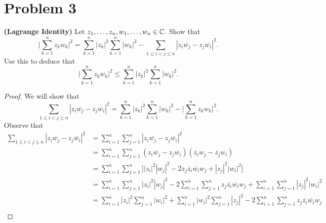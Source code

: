 \documentclass[a4paper]{article}
\begin{document}
    \section*{Problem 3} \textbf{(Lagrange Identity)} Let \( {z}_{1}, \dots, {z}_{n}, {w}_{1}, \dots, {w}_{n} \in \mathbb{C}   \). Show that    
        \[  \Big| \sum_{ k=1  }^{ n } {z}_{k} {w}_{k} \Big|^{2} = \sum_{ k=1  }^{ n } | {z}_{k} |^{2} \sum_{ k=1  }^{ n } | {w}_{k } |^{2} - \sum_{ 1 \leq i < j \leq n  }^{  } | {z}_{i} \overline{{w}_{j}} - {z}_{j} \overline{{w}_{i}} |^{2}. \]
        Use this to deduce that 
        \[  \Big| \sum_{ k=1  }^{ n } {z}_{k } {w}_{k } \Big|^{2} \leq \sum_{ k=1  }^{ n } | {z}_{k} |^{2} \sum_{ k=1  }^{ n } | {w}_{k } |^{2}. \]
        \begin{proof}
        We will show that 
        \[  \sum_{ 1 \leq i < j \leq n  }^{  } | {z}_{i} \overline{{w}_{j}} - {z}_{j} \overline{{w}_{i}} |^{2} = \sum_{ k=1  }^{ n } | {z}_{k } |^{2} \sum_{ k=1  }^{ n } | {w}_{k } |^{2} - \Big|  \sum_{ k=1  }^{ n } {z}_{k } {w}_{k } \Big|^{2}. \]
        Observe that 
        \begin{align*}
            \sum_{ 1 \leq i < j \leq n  }^{  } | {z}_{i} \overline{{w}_{j}} - {z}_{j} \overline{{w}_{i}}  |^{2} &= \sum_{ i=1  }^{ n } \sum_{ j=1  }^{ n } | {z}_{i} \overline{{w}_{j}} - {z}_{j} \overline{{w}_{i}} |^{2}  \\
                                                                                                                &= \sum_{ i=1  }^{ n } \sum_{ j=1  }^{ n } ({z}_{i} \overline{{w}_{j}} - {z}_{j} \overline{{w}_{i}})(\overline{{z}_{i}} {w}_{j} - \overline{{z}_{j}} {w}_{i}) \\
                                                                                                                &= \sum_{ i=1  }^{ n } \sum_{ j=1  }^{ n } \Big[ | {z}_{i} |^{2} | {w}_{j} |^{2} - 2 {z}_{j} \overline{{z}_{i}} \overline{{w}_{i}} {w}_{j} + | {z}_{j} |^{2} | {w}_{i} |^{2} \Big] \\
                                                                                                                &= \sum_{ i=1  }^{ n } \sum_{ j=1  }^{ n } | {z}_{i} |^{2} | {w}_{j} |^{2} - 2 \sum_{ i=1  }^{ n }\sum_{ j=1  }^{ n } {z}_{j} \overline{{z}_{i}} \overline{{w}_{i}} {w}_{j}
                                                                                                                + \sum_{ i=1  }^{ n } \sum_{ j=1  }^{ n } | {z}_{j} |^{2} | {w}_{i} |^{2} \\
                                                                                                                &= \sum_{ i=1  }^{ n } | {z}_{i} |^{2} \sum_{ j=1  }^{ n } | {w}_{i} |^{2} + \sum_{ i=1  }^{ n } | {w}_{i} |^{2} \sum_{ j=1  }^{ n } | {z}_{j} |^{2} - 2 \sum_{ i=1  }^{ n } \sum_{ j = 1   }^{ n } {z}_{j} \overline{{z}_{i}} \overline{{w}_{i}} {w}_{j} \\

\end{align*}
\end{proof}
\end{document}
